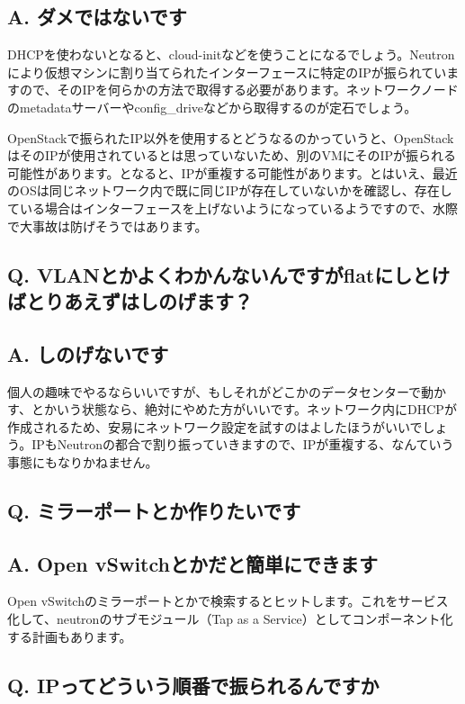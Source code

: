 \documentclass[9pt,b5paper,tombo,openany]{jsbook}
\begin{document}
\subsection*{{\LARGE\bfseries A.} ダメではないです}
DHCPを使わないとなると、cloud-initなどを使うことになるでしょう。Neutronにより仮想マシンに割り当てられたインターフェースに特定のIPが振られていますので、そのIPを何らかの方法で取得する必要があります。ネットワークノードのmetadataサーバーやconfig\_driveなどから取得するのが定石でしょう。

OpenStackで振られたIP以外を使用するとどうなるのかっていうと、OpenStackはそのIPが使用されているとは思っていないため、別のVMにそのIPが振られる可能性があります。となると、IPが重複する可能性があります。とはいえ、最近のOSは同じネットワーク内で既に同じIPが存在していないかを確認し、存在している場合はインターフェースを上げないようになっているようですので、水際で大事故は防げそうではあります。

\subsection*{{\LARGE\bfseries Q.} VLANとかよくわかんないんですがflatにしとけばとりあえずはしのげます？}
\subsection*{{\LARGE\bfseries A.} しのげないです}
個人の趣味でやるならいいですが、もしそれがどこかのデータセンターで動かす、とかいう状態なら、絶対にやめた方がいいです。ネットワーク内にDHCPが作成されるため、安易にネットワーク設定を試すのはよしたほうがいいでしょう。IPもNeutronの都合で割り振っていきますので、IPが重複する、なんていう事態にもなりかねません。

\subsection*{{\LARGE\bfseries Q.} ミラーポートとか作りたいです}
\subsection*{{\LARGE\bfseries A.} Open vSwitchとかだと簡単にできます}
Open vSwitchのミラーポートとかで検索するとヒットします。これをサービス化して、neutronのサブモジュール（Tap as a Service）としてコンポーネント化する計画もあります。

\subsection*{{\LARGE\bfseries Q.} IPってどういう順番で振られるんですか}
\end{document}
